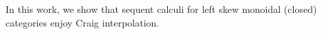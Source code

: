 \documentclass[sn-mathphys-num]{sn-jnl}%
\newcommand{\GG}{\Gamma}
\newcommand{\vd}{\vdash}
\newcommand{\SkNMILL}{$\mathtt{SkNMILL}$}
\newcommand{\LSkT}{$\mathtt{LSkT}$}
\newcommand{\SkBiCT}{$\mathtt{SkBiCT}$}
\newcommand{\SkBiCA}{$\mathtt{SkBiCA}$}
\theoremstyle{thmstyleone}%
\theoremstyle{thmstyletwo}%
\theoremstyle{thmstylethree}%
\begin{document}
In this work, we show that sequent calculi for left skew monoidal (closed) categories enjoy Craig interpolation.




\end{document}
